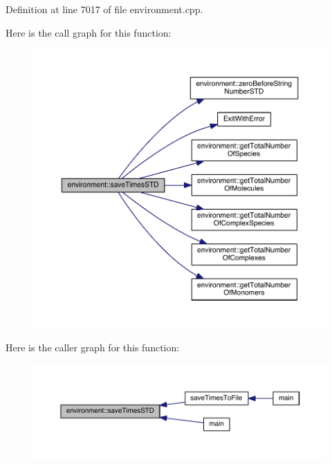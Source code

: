 Definition at line 7017 of file environment.\+cpp.



Here is the call graph for this function\+:\nopagebreak
\begin{figure}[H]
\begin{center}
\leavevmode
\includegraphics[width=350pt]{a00013_a73e83c4fcfe612514714a6692270351e_cgraph}
\end{center}
\end{figure}




Here is the caller graph for this function\+:\nopagebreak
\begin{figure}[H]
\begin{center}
\leavevmode
\includegraphics[width=350pt]{a00013_a73e83c4fcfe612514714a6692270351e_icgraph}
\end{center}
\end{figure}


